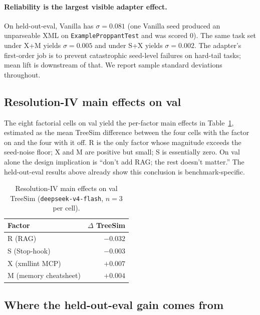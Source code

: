 \documentclass{article}
\begin{document}
\paragraph{Reliability is the largest visible adapter effect.} On held-out-eval, Vanilla has $\sigma=0.081$ (one Vanilla seed produced an unparseable XML on \texttt{ExampleProppantTest} and was scored 0). The same task set under X+M yields $\sigma=0.005$ and under S+X yields $\sigma=0.002$. The adapter's first-order job is to prevent catastrophic seed-level failures on hard-tail tasks; mean lift is downstream of that. We report sample standard deviations throughout.

\subsection{Resolution-IV main effects on val}
\label{subsec:main-effects}

The eight factorial cells on val yield the per-factor main effects in Table~\ref{tab:main-effects}, estimated as the mean TreeSim difference between the four cells with the factor on and the four with it off. R is the only factor whose magnitude exceeds the seed-noise floor; X and M are positive but small; S is essentially zero. On val alone the design implication is ``don't add RAG; the rest doesn't matter.'' The held-out-eval results above already show this conclusion is benchmark-specific.

\begin{table}[h]
  \caption{Resolution-IV main effects on val TreeSim (\texttt{deepseek-v4-flash}, $n=3$ per cell).}
  \label{tab:main-effects}
  \centering
  \small
  \begin{tabular}{lr}
    \toprule
    \textbf{Factor} & \textbf{$\Delta$ TreeSim} \\
    \midrule
    R (RAG)                & $-0.032$ \\
    S (Stop-hook)          & $-0.003$ \\
    X (xmllint MCP)        & $+0.007$ \\
    M (memory cheatsheet)  & $+0.004$ \\
    \bottomrule
  \end{tabular}
\end{table}

\subsection{Where the held-out-eval gain comes from}
\label{subsec:per-task}
\end{document}
